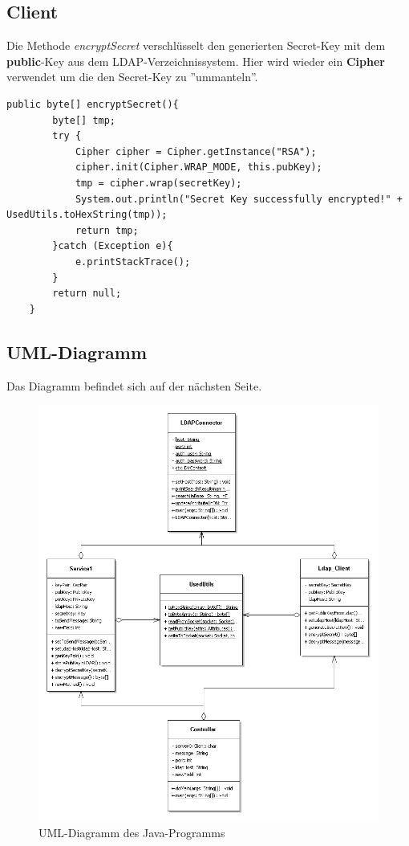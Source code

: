 \newpage

\subsection{Client}

Die Methode \textit{encryptSecret} verschlüsselt den generierten Secret-Key mit dem \textbf{public}-Key aus dem LDAP-Verzeichnissystem. Hier wird wieder ein \textbf{Cipher} verwendet um die den Secret-Key zu ''ummanteln''.


\begin{lstlisting}[style=Java, caption= SecretKey encrypting on Client-Side]
    public byte[] encryptSecret(){
	    byte[] tmp;
	    try {
		    Cipher cipher = Cipher.getInstance("RSA");
		    cipher.init(Cipher.WRAP_MODE, this.pubKey);
			tmp = cipher.wrap(secretKey);
		    System.out.println("Secret Key successfully encrypted!" + UsedUtils.toHexString(tmp));
		    return tmp;
		}catch (Exception e){
		    e.printStackTrace();
	    }
	    return null;
    }
\end{lstlisting}

\subsection{UML-Diagramm}
Das Diagramm befindet sich auf der nächsten Seite.

\begin{figure}[!h]
	\begin{center}
		\includegraphics[width=\textwidth]{images/Java_Security_UML}
		\caption{UML-Diagramm des Java-Programms}
		\label{broker}
	\end{center}
\end{figure}

